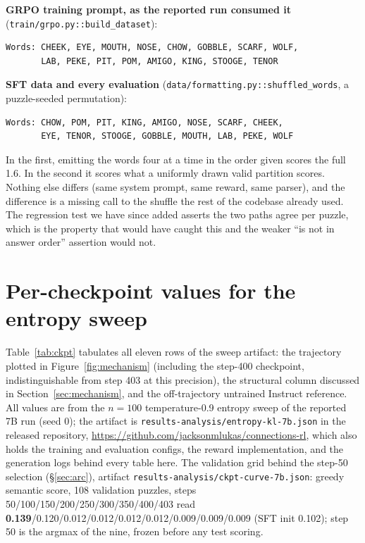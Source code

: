 \documentclass{article}
\newcommand{\repourl}{\url{https://github.com/jacksonmlukas/connections-rl}}
\begin{document}
\medskip
\noindent\textbf{GRPO training prompt, as the reported run consumed it}
(\texttt{train/grpo.py::build\_dataset}):

{\footnotesize\begin{verbatim}
Words: CHEEK, EYE, MOUTH, NOSE, CHOW, GOBBLE, SCARF, WOLF,
       LAB, PEKE, PIT, POM, AMIGO, KING, STOOGE, TENOR
\end{verbatim}}

\noindent\textbf{SFT data and every evaluation}
(\texttt{data/formatting.py::shuffled\_words}, a puzzle-seeded permutation):

{\footnotesize\begin{verbatim}
Words: CHOW, POM, PIT, KING, AMIGO, NOSE, SCARF, CHEEK,
       EYE, TENOR, STOOGE, GOBBLE, MOUTH, LAB, PEKE, WOLF
\end{verbatim}}

\medskip
In the first, emitting the words four at a time in the order given scores
the full 1.6. In the second it scores what a uniformly drawn valid
partition scores. Nothing else differs (same system prompt, same reward,
same parser), and the difference is a missing call to the shuffle the
rest of the codebase already used. The regression test we have since added
asserts the two paths agree per puzzle, which is the property that would
have caught this and the weaker ``is not in answer order'' assertion would
not.

\section{Per-checkpoint values for the entropy sweep}
\label{app:ckpt}

Table~\ref{tab:ckpt} tabulates all eleven rows of the sweep artifact: the
trajectory plotted in Figure~\ref{fig:mechanism} (including the step-400
checkpoint, indistinguishable from step 403 at this precision), the
structural column discussed in Section~\ref{sec:mechanism}, and the
off-trajectory untrained Instruct reference. All values are from the $n=100$
temperature-0.9
entropy sweep of the reported 7B run (seed 0); the artifact is
\texttt{results-analysis/entropy-kl-7b.json} in the released repository,
\repourl{}, which also holds the
training and evaluation configs, the reward implementation, and the
generation logs behind every table here. The validation grid behind the step-50 selection (\S\ref{sec:arc}), artifact \texttt{results-analysis/ckpt-curve-7b.json}: greedy semantic score, 108 validation puzzles, steps 50/100/150/200/250/300/350/400/403 read \textbf{0.139}/0.120/0.012/0.012/0.012/0.012/0.009/0.009/0.009 (SFT init 0.102); step 50 is the argmax of the nine, frozen before any test scoring.
\end{document}

